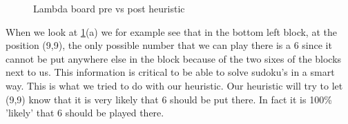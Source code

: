 \documentclass{report}
\begin{document}
\begin{figure}[h]
    \centering
    \qquad
    \caption{Lambda board pre vs post heuristic}%
    \label{fig:classic_heuristic}%
\end{figure}
When we look at \ref{fig:classic_heuristic}(a) we for example see that in the bottom left block, at the position (9,9), the only possible number that we can play there is a 6 since it cannot be put anywhere else in the block because of the two sixes of the blocks next to us. This information is critical to be able to solve sudoku's in a smart way. This is what we tried to do with our heuristic. Our heuristic will try to let (9,9) know that it is very likely that 6 should be put there. In fact it is 100\% 'likely' that 6 should be played there.
\newline
\newline
\newline
\end{document}
